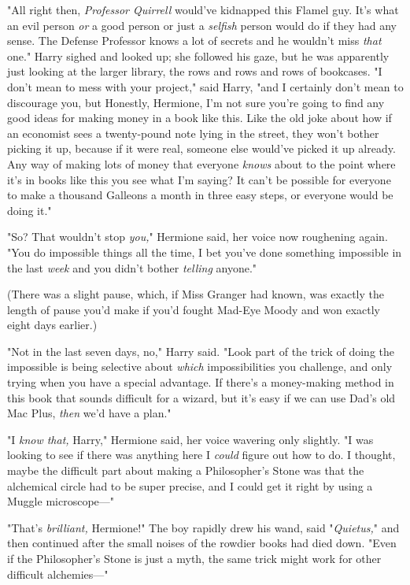 "All right then, \emph{Professor Quirrell} would've kidnapped this Flamel guy.
It's what an evil person \emph{or} a good person or just a \emph{selfish}
person would do if they had any sense. The Defense Professor knows a lot of
secrets and he wouldn't miss \emph{that} one." Harry sighed and looked up; she
followed his gaze, but he was apparently just looking at the larger library,
the rows and rows and rows of bookcases. "I don't mean to mess with your
project," said Harry, "and I certainly don't mean to discourage you,
but{\el} Honestly, Hermione, I'm not sure you're going to find any good
ideas for making money in a book like this. Like the old joke about how if an
economist sees a twenty-pound note lying in the street, they won't bother
picking it up, because if it were real, someone else would've picked it up
already. Any way of making lots of money that everyone \emph{knows} about to
the point where it's in books like this{\el} you see what I'm saying? It
can't be possible for everyone to make a thousand Galleons a month in three
easy steps, or everyone would be doing it."

"So? That wouldn't stop \emph{you,}" Hermione said, her voice now roughening
again. "You do impossible things all the time, I bet you've done something
impossible in the last \emph{week} and you didn't bother \emph{telling} anyone."

(There was a slight pause, which, if Miss Granger had known, was exactly the
length of pause you'd make if you'd fought Mad-Eye Moody and won exactly eight
days earlier.)

"Not in the last seven days, no," Harry said. "Look{\el} part of the trick
of doing the impossible is being selective about \emph{which} impossibilities
you challenge, and only trying when you have a special advantage. If there's a
money-making method in this book that sounds difficult for a wizard, but it's
easy if we can use Dad's old Mac Plus, \emph{then} we'd have a plan."

"I \emph{know that,} Harry," Hermione said, her voice wavering only slightly.
"I was looking to see if there was anything here I \emph{could} figure out how
to do. I thought, maybe the difficult part about making a Philosopher's Stone
was that the alchemical circle had to be super precise, and I could get it
right by using a Muggle microscope\mbox{---}"

"That's \emph{brilliant,} Hermione!" The boy rapidly drew his wand, said
"\emph{Quietus,}" and then continued after the small noises of the rowdier
books had died down. "Even if the Philosopher's Stone is just a myth, the same
trick might work for other difficult alchemies\mbox{---}"

